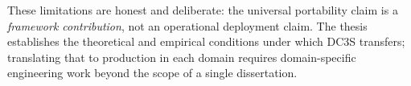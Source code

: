 These limitations are honest and deliberate: the universal portability claim
is a \emph{framework contribution}, not an operational deployment claim.  The
thesis establishes the theoretical and empirical conditions under which DC3S
transfers; translating that to production in each domain requires domain-specific
engineering work beyond the scope of a single dissertation.
